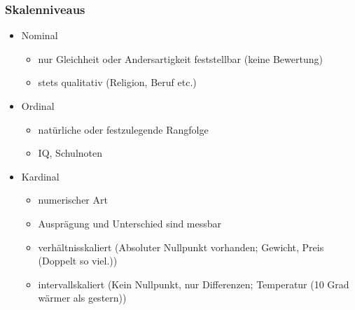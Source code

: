 \documentclass[a4paper]{article}
\begin{document}
\begin{landscape}
\begin{multicols}{4}
    \subsubsection*{Skalenniveaus}
    \begin{itemize}[noitemsep,nolistsep,leftmargin=*]
        \item Nominal
        \begin{itemize}[noitemsep,nolistsep,leftmargin=*]
            \item nur Gleichheit oder Andersartigkeit feststellbar (keine Bewertung)
            \item stets qualitativ (Religion, Beruf etc.)
        \end{itemize}
        \item Ordinal
        \begin{itemize}[noitemsep,nolistsep,leftmargin=*]
            \item natürliche oder festzulegende Rangfolge
            \item IQ, Schulnoten
        \end{itemize}
        \item Kardinal
        \begin{itemize}[noitemsep,nolistsep,leftmargin=*]
            \item numerischer Art 
            \item Ausprägung und Unterschied sind messbar
            \item verhältnisskaliert (Absoluter Nullpunkt vorhanden; Gewicht, Preis (Doppelt so viel.))
            \item intervallskaliert (Kein Nullpunkt, nur Differenzen; Temperatur (10 Grad wärmer als gestern))
        \end{itemize}
    \end{itemize}

\end{multicols}
\end{landscape}
\end{document}
